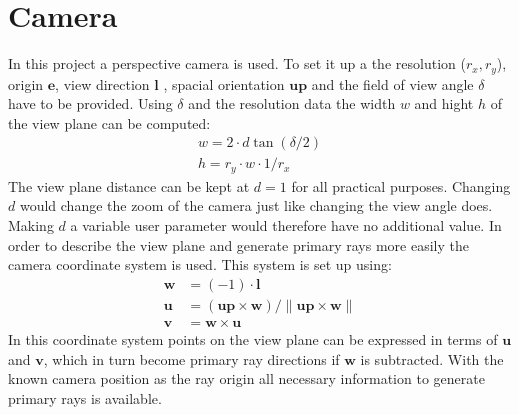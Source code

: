 \section{Camera}
In this project a perspective camera is used. To set it up a the resolution ($r_x,r_y$), origin $\mathbf{e}$, view direction $\mathbf{l}$ , spacial orientation $\mathbf{up}$ and the field of view angle $\delta$ have to be provided. Using $\delta$ and the resolution data the width $w$ and hight $h$ of the view plane can be computed:
\begin{align}
w = 2 \cdot d \tan(\delta/2) \\
h = r_y \cdot w \cdot 1/r_x
\end{align}
The view plane distance can be kept at $d = 1$ for all practical purposes. Changing $d$ would change the zoom of the camera just like changing the view angle does. Making $d$ a variable user parameter would therefore have no additional value. 
In order to describe the view plane and generate primary rays more easily the camera coordinate system is used. This system is set up using:
\begin{align}
\mathbf{w} &= (-1) \cdot \mathbf{l} \\
\mathbf{u} &= (\mathbf{up} \times \mathbf{w})/ \|\mathbf{up} \times \mathbf{w} \| \\
\mathbf{v} &= \mathbf{w} \times \mathbf{u}
\end{align}
In this coordinate system points on the view plane can be expressed in terms of $\mathbf{u}$ and $\mathbf{v}$, which in turn become primary ray directions if $\mathbf{w}$ is subtracted. With the known camera position as the ray origin all necessary information to generate primary rays is available.

